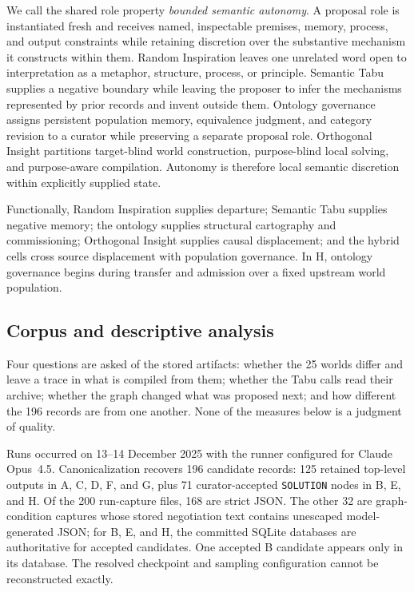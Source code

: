 \documentclass[11pt,a4paper]{article}
\begin{document}
We call the shared role property \emph{bounded semantic autonomy}. A proposal role is instantiated fresh and receives named, inspectable premises, memory, process, and output constraints while retaining discretion over the substantive mechanism it constructs within them. Random Inspiration leaves one unrelated word open to interpretation as a metaphor, structure, process, or principle. Semantic Tabu supplies a negative boundary while leaving the proposer to infer the mechanisms represented by prior records and invent outside them. Ontology governance assigns persistent population memory, equivalence judgment, and category revision to a curator while preserving a separate proposal role. Orthogonal Insight partitions target-blind world construction, purpose-blind local solving, and purpose-aware compilation. Autonomy is therefore local semantic discretion within explicitly supplied state.

Functionally, Random Inspiration supplies departure; Semantic Tabu supplies negative memory; the ontology supplies structural cartography and commissioning; Orthogonal Insight supplies causal displacement; and the hybrid cells cross source displacement with population governance. In H, ontology governance begins during transfer and admission over a fixed upstream world population.

\subsection{Corpus and descriptive analysis}

Four questions are asked of the stored artifacts: whether the 25 worlds differ and leave a trace in what is compiled from them; whether the Tabu calls read their archive; whether the graph changed what was proposed next; and how different the 196 records are from one another. None of the measures below is a judgment of quality.

Runs occurred on 13--14 December 2025 with the runner configured for Claude Opus~4.5. Canonicalization recovers 196 candidate records: 125 retained top-level outputs in A, C, D, F, and G, plus 71 curator-accepted \texttt{SOLUTION} nodes in B, E, and H. Of the 200 run-capture files, 168 are strict JSON. The other 32 are graph-condition captures whose stored negotiation text contains unescaped model-generated JSON; for B, E, and H, the committed SQLite databases are authoritative for accepted candidates. One accepted B candidate appears only in its database. The resolved checkpoint and sampling configuration cannot be reconstructed exactly.
\end{document}
